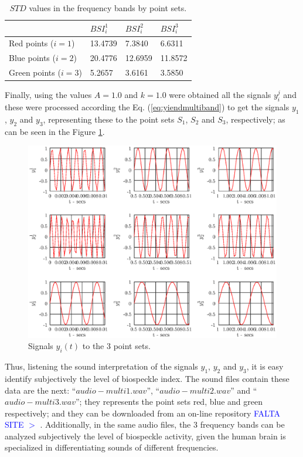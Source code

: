 \documentclass[review]{elsarticle}
\begin{document}
\begin{table}[!hbt]
\caption{$STD$ values in the frequency bands by point sets.}
\begin{center}
\begin{tabular}{|l |l | l | l |}
\hline
   ~               & $BSI^1_i$ & $BSI^2_i$ & $BSI^3_i$ \\
\hline
\hline
Red points   ($i=1$)&   13.4739&    7.3840&    6.6311\\
Blue points  ($i=2$)&   20.4776&   12.6959&   11.8572\\
Green points ($i=3$)&    5.2657&    3.6161&    3.5850\\
\hline
\end{tabular}
\end{center}
\label{tab:2}
\end{table}
Finally, using the values $A=1.0$ and $k=1.0$ were obtained all the signals 
$y^j_i$ and these were processed according the Eq. (\ref{eq:yiendmultiband})
to get the signals $y_1$, $y_2$ and $y_3$, representing these to the point sets $S_1$, $S_2$ and $S_3$,
respectively; as can be seen in the Figure \ref{fig:yfuncs}.
\begin{figure}[ht!]
\centering
\includegraphics[width=0.99\columnwidth]{yfuncs.eps}
\caption{Signals $y_i(t)$ to the 3 point sets.}
\label{fig:yfuncs}
\end{figure}
Thus, listening the sound interpretation of the signals $y_1$, $y_2$ and $y_3$, it is easy
identify subjectively the level of biospeckle index.
The sound files contain these data are the next: 
``$audio-multi1.wav$'', ``$audio-multi2.wav$'' and ``$audio-multi3.wav$''; 
they represents the point sets red, blue and green respectively; 
and they can be downloaded from an on-line repository \textcolor{blue}{FALTA SITE $>$} \cite{BSLTLMULTI}.
Additionally, in the same audio files, the 3 frequency bands can be analyzed subjectively the level
of biospeckle activity, given the human brain is specialized in differentiating sounds of different frequencies.
\end{document}
